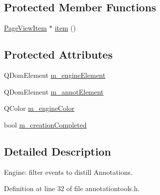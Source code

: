 \subsection*{Protected Member Functions}
\begin{DoxyCompactItemize}
\item 
\hyperlink{classPageViewItem}{Page\+View\+Item} $\ast$ \hyperlink{classAnnotatorEngine_a67d46d5364e6f54e107ccbbb1ed07e32}{item} ()
\end{DoxyCompactItemize}
\subsection*{Protected Attributes}
\begin{DoxyCompactItemize}
\item 
Q\+Dom\+Element \hyperlink{classAnnotatorEngine_aa60b9dda9bd0beb5af6f777b1e65b342}{m\+\_\+engine\+Element}
\item 
Q\+Dom\+Element \hyperlink{classAnnotatorEngine_ac95af6291cc2f0c601e1bbf8a5e6a0bd}{m\+\_\+annot\+Element}
\item 
Q\+Color \hyperlink{classAnnotatorEngine_a8911b0455be7eedfb2c102ce19acdce2}{m\+\_\+engine\+Color}
\item 
bool \hyperlink{classAnnotatorEngine_a0df119b4d87a1e3ea8ed60a96d7ff444}{m\+\_\+creation\+Completed}
\end{DoxyCompactItemize}


\subsection{Detailed Description}
Engine\+: filter events to distill Annotations. 

Definition at line 32 of file annotationtools.\+h.



